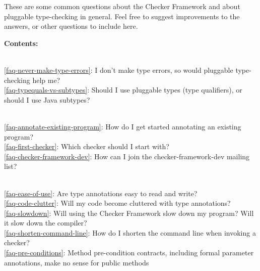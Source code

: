 
These are some common questions about the Checker Framework and about
pluggable type-checking in general.  Feel free to suggest improvements to
the answers, or other questions to include here.


\warpprintonly{~}

  {\newcommand{\faqtocpara}[1]{\textbf{#1}}}
  {\newcommand{\faqtocpara}[1]{\paragraph{#1} ~}}


\noindent
\textbf{Contents:}

\\ \ref{faq-never-make-type-errors}: I don't make type errors, so would pluggable type-checking help me?
\\ \ref{faq-typequals-vs-subtypes}: Should I use pluggable types (type qualifiers), or should I use Java subtypes?

\\ \ref{faq-annotate-existing-program}: How do I get started annotating an existing program?
\\ \ref{faq-first-checker}: Which checker should I start with?
\\ \ref{faq-checker-framework-dev}: How can I join the checker-framework-dev mailing list?

\\ \ref{faq-ease-of-use}: Are type annotations easy to read and write?
\\ \ref{faq-code-clutter}: Will my code become cluttered with type annotations?
\\ \ref{faq-slowdown}: Will using the Checker Framework slow down my program?  Will it slow down the compiler?
\\ \ref{faq-shorten-command-line}: How do I shorten the command line when invoking a checker?
\\ \ref{faq-pre-conditions}: Method pre-condition contracts, including formal parameter annotations, make no sense for public methods

